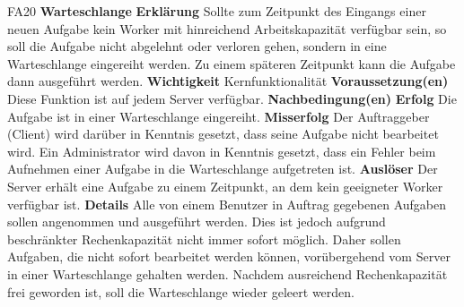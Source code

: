 \documentclass[a4paper,12pt]{article}
\begin{document}
\begin{itemize}[nosep]
\begin{minipage}[t]{\linewidth}
\item[FA20] \textbf{Warteschlange}
\subitem \textbf{Erklärung} Sollte zum Zeitpunkt des Eingangs einer neuen Aufgabe kein \gls{Worker} mit hinreichend Arbeitskapazität verfügbar sein, so soll die Aufgabe nicht abgelehnt oder verloren gehen, sondern in eine Warteschlange eingereiht werden. Zu einem späteren Zeitpunkt kann die Aufgabe dann ausgeführt werden.
\subitem \textbf{Wichtigkeit} Kernfunktionalität
\subitem \textbf{Voraussetzung(en)} Diese Funktion ist auf jedem \gls{Server} verfügbar.
\subitem \textbf{Nachbedingung(en)}
\subsubitem \textbf{Erfolg} Die Aufgabe ist in einer Warteschlange eingereiht.
\subsubitem \textbf{Misserfolg} Der Auftraggeber (\gls{Client}) wird darüber in Kenntnis gesetzt, dass seine Aufgabe nicht bearbeitet wird.\newline
Ein \gls{Administrator} wird davon in Kenntnis gesetzt, dass ein Fehler beim Aufnehmen einer Aufgabe in die Warteschlange aufgetreten ist.
\subitem \textbf{Auslöser} Der \gls{Server} erhält eine Aufgabe zu einem Zeitpunkt, an dem kein geeigneter \gls{Worker} verfügbar ist.
\subitem \textbf{Details} Alle von einem \gls{Benutzer} in Auftrag gegebenen Aufgaben sollen angenommen und ausgeführt werden. Dies ist jedoch aufgrund beschränkter Rechenkapazität nicht immer sofort möglich. Daher sollen Aufgaben, die nicht sofort bearbeitet werden können, vorübergehend vom \gls{Server} in einer Warteschlange gehalten werden. Nachdem ausreichend Rechenkapazität frei geworden ist, soll die Warteschlange wieder geleert werden.
\end{minipage}
\pagebreak


\end{itemize}
\end{document}
